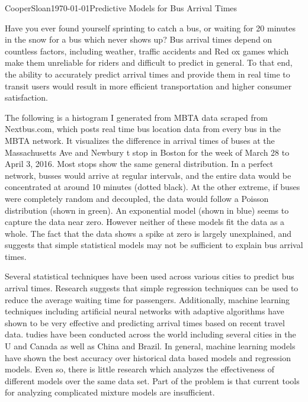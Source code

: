 \documentclass[12pt,letterpaper]{article}
\begin{document}
\begin{mla}{Cooper}{Sloan}{\today}{Predictive Models for Bus Arrival Times}

Have you ever found yourself sprinting to catch a bus, or waiting for 20 minutes in the snow for a bus which never shows up?  Bus arrival times depend on countless factors, including weather, traffic accidents and Red ox games which make them unreliable for riders and difficult to predict in general.  To that end, the ability to accurately predict arrival times and provide them in real time to transit users would result in more efficient transportation and higher consumer satisfaction.

The following is a histogram I generated from MBTA data scraped from Nextbus.com, which posts real time bus location data from every bus in the MBTA network.  It visualizes the difference in arrival times of buses at the Massachusetts Ave and Newbury t stop in Boston for the week of March 28 to April 3, 2016.  Most stops show the same general distribution.  In a perfect network, busses would arrive at regular intervals, and the entire data would be concentrated at around 10 minutes (dotted black).  At the other extreme, if buses were completely random and decoupled, the data would follow a Poisson distribution (shown in green).  An exponential model (shown in blue) seems to capture the data near zero.  However neither of these models fit the data as a whole. The fact that the data shows a spike at zero is largely unexplained, and suggests that simple statistical models may not be sufficient to explain bus arrival times.

Several statistical techniques have been used across various cities to predict bus arrival times.  Research suggests that simple regression techniques can be used to reduce the average waiting time for passengers.  Additionally, machine learning techniques including artificial neural networks with adaptive algorithms have shown to be very effective and predicting arrival times based on recent travel data.  tudies have been conducted across the world including several cities in the U and Canada as well as China and Brazil.  In general, machine learning models have shown the best accuracy over historical data based models and regression models.  Even so, there is little research which analyzes the effectiveness of different models over the same data set.  Part of the problem is that current tools for analyzing complicated mixture models are insufficient.


\end{mla}
\end{document}
